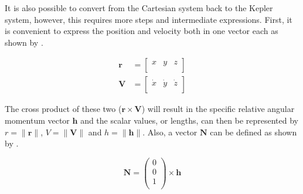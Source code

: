 

It is also possible to convert from the Cartesian system back to the Kepler system, however, this requires more steps and intermediate expressions. First, it is convenient to express the position and velocity both in one vector each as shown by .

\begin{equation}\label{eq:randvvectors}
\begin{split}
\mathbf{r}&=\begin{bmatrix}
x & y & z\\
\end{bmatrix}\\
\mathbf{V}&=\begin{bmatrix}
\dot{x} & \dot{y} & \dot{z}\\
\end{bmatrix}
\end{split}
\end{equation}

The cross product of these two ($\mathbf{r}\times\mathbf{V}$) will result in the specific relative angular momentum vector $\mathbf{h}$ and the scalar values, or lengths, can then be represented by $r=\|\mathbf{r}\|$, $V=\|\mathbf{V}\|$ and $h=\|\mathbf{h}\|$. Also, a vector $\mathbf{N}$ can be defined as shown by \citep{noomen2013basic}.

\begin{equation}\label{eq:N}
\mathbf{N}=\begin{pmatrix}
0\\
0\\
1\\
\end{pmatrix}
\times
\mathbf{h}
\end{equation}

